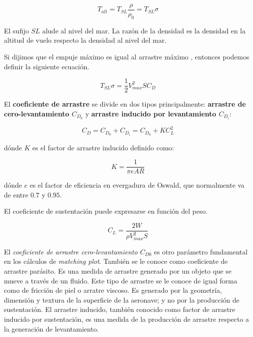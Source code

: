 \begin{equation}
    T_{alt} = T_{SL} \frac{\rho}{\rho_0} = T_{SL} \sigma
\end{equation}

El sufijo $SL$ alude al nivel del mar. La razón de la densidad es la densidad en la altitud de vuelo respecto la densidad al nivel del mar.

Si dijimos que el empuje máximo es igual al arrastre máximo , entonces podemos definir la siguiente ecuación. 

\begin{equation}
\label{empuje nivel del mar}
    T_{SL} \sigma = \frac{1}{2} V_{max}^2 S C_D
\end{equation}

El \textbf{coeficiente de arrastre} se divide en dos tipos principalmente: \textbf{arrastre de cero-levantamiento $C_{D_0}$} y \textbf{arrastre inducido por levantamiento $C_{D_i}$}:

\begin{equation}
    C_D = C_{D_0} + C_{D_i} = C_{D_0} +  K C_{L}^2 
\end{equation}

dónde $K$ es el factor de arrastre inducido definido como:

\begin{equation}
    K = \frac{1}{\pi e AR}
\end{equation}

dónde $e$ es el factor de eficiencia en evergadura de Oswald, que normalmente va de entre $0.7$ y $0.95$. 


El coeficiente de sustentación puede expresarse en función del peso. 

\begin{equation}
\label{levantamiento peso}
    C_{L} = \frac{2W}{\rho V_{max}^2 S}
\end{equation}

El \textit{coeficiente de arrastre cero-levantamiento $C_{D0}$} es otro parámetro fundamental en los cálculos de \textit{matching plot}. 
También se le conoce como coeficiente de arrastre parásito. Es una medida de arrastre generado por un objeto que se mueve a través de un fluido. Este tipo de arrastre se le conoce de igual forma como de fricción de piel o arratre viscoso. Es generado por la geometría, dimensión y textura de la superficie de la aeronave; y no por la producción de sustentación. 
El arrastre inducido, también conocido como factor de arrastre inducido por sustentación, es una medida de la producción de arrastre respecto a la generación de levantamiento. 

